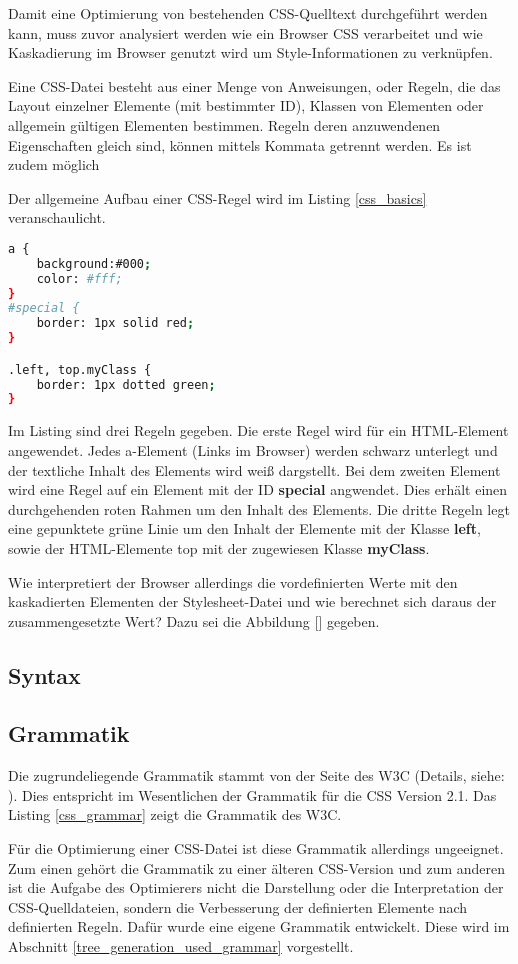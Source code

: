 Damit eine Optimierung von bestehenden CSS-Quelltext durchgeführt werden kann, muss zuvor analysiert werden wie ein Browser CSS verarbeitet und wie Kaskadierung im Browser genutzt wird um Style-Informationen zu verknüpfen.

Eine CSS-Datei besteht aus einer Menge von Anweisungen, oder Regeln, die das Layout einzelner Elemente (mit bestimmter ID), Klassen von Elementen oder allgemein gültigen Elementen bestimmen. Regeln deren anzuwendenen Eigenschaften gleich sind, können mittels Kommata getrennt werden. Es ist zudem möglich


Der allgemeine Aufbau einer CSS-Regel wird im Listing \ref{css_basics} veranschaulicht.   
\begin{lstlisting}[label=css_basics,language=bash, caption=Aufbau einer CSS-Regel]
a {
    background:#000;
    color: #fff;
}  
#special {
    border: 1px solid red;
}

.left, top.myClass {
    border: 1px dotted green;
}
\end{lstlisting}

Im Listing sind drei Regeln gegeben. Die erste Regel wird für ein HTML-Element angewendet. Jedes a-Element (Links im Browser) werden schwarz unterlegt und der textliche Inhalt des Elements wird weiß dargstellt. Bei dem zweiten Element wird eine Regel auf ein Element mit der ID \textbf{special} angwendet. Dies erhält einen durchgehenden roten Rahmen um den Inhalt des Elements. Die dritte Regeln legt eine gepunktete grüne Linie um den Inhalt der Elemente mit der Klasse \textbf{left}, sowie der HTML-Elemente top mit der zugewiesen Klasse \textbf{myClass}.  

Wie interpretiert der Browser allerdings die vordefinierten Werte mit den kaskadierten Elementen der Stylesheet-Datei und wie berechnet sich daraus der zusammengesetzte Wert? Dazu sei die Abbildung [] gegeben. %

\subsection{Syntax}

\subsection{Grammatik}
Die zugrundeliegende Grammatik stammt von der Seite des W3C (Details, siehe: \cite{w3c_css_grammar}). Dies entspricht im Wesentlichen der Grammatik für die CSS Version 2.1. Das Listing \ref{css_grammar} zeigt die Grammatik des W3C. 

Für die Optimierung einer CSS-Datei ist diese Grammatik allerdings ungeeignet. Zum einen gehört die Grammatik zu einer älteren CSS-Version und zum anderen ist die Aufgabe des Optimierers nicht die Darstellung oder die Interpretation der CSS-Quelldateien, sondern die Verbesserung der definierten Elemente nach definierten Regeln. Dafür wurde eine eigene Grammatik entwickelt. Diese wird im Abschnitt \ref{tree_generation_used_grammar} vorgestellt. 


